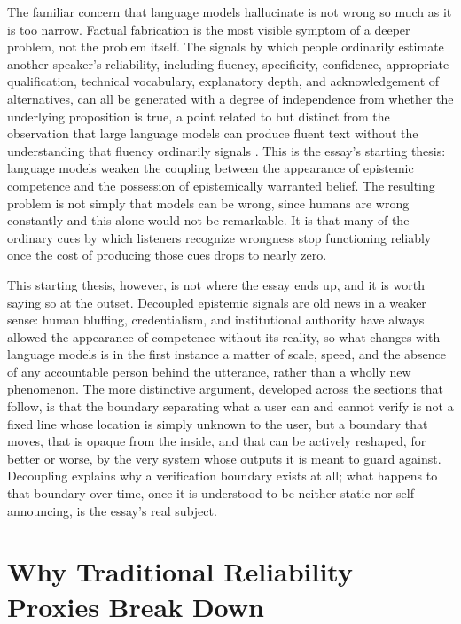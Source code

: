 \documentclass[11pt]{article}
\begin{document}
The familiar concern that language models hallucinate is not wrong so much as it is too narrow. Factual fabrication is the most visible symptom of a deeper problem, not the problem itself. The signals by which people ordinarily estimate another speaker's reliability, including fluency, specificity, confidence, appropriate qualification, technical vocabulary, explanatory depth, and acknowledgement of alternatives, can all be generated with a degree of independence from whether the underlying proposition is true, a point related to but distinct from the observation that large language models can produce fluent text without the understanding that fluency ordinarily signals \cite{bender2021}. This is the essay's starting thesis: language models weaken the coupling between the appearance of epistemic competence and the possession of epistemically warranted belief. The resulting problem is not simply that models can be wrong, since humans are wrong constantly and this alone would not be remarkable. It is that many of the ordinary cues by which listeners recognize wrongness stop functioning reliably once the cost of producing those cues drops to nearly zero.

This starting thesis, however, is not where the essay ends up, and it is worth saying so at the outset. Decoupled epistemic signals are old news in a weaker sense: human bluffing, credentialism, and institutional authority have always allowed the appearance of competence without its reality, so what changes with language models is in the first instance a matter of scale, speed, and the absence of any accountable person behind the utterance, rather than a wholly new phenomenon. The more distinctive argument, developed across the sections that follow, is that the boundary separating what a user can and cannot verify is not a fixed line whose location is simply unknown to the user, but a boundary that moves, that is opaque from the inside, and that can be actively reshaped, for better or worse, by the very system whose outputs it is meant to guard against. Decoupling explains why a verification boundary exists at all; what happens to that boundary over time, once it is understood to be neither static nor self-announcing, is the essay's real subject.

\section{Why Traditional Reliability Proxies Break Down}
\end{document}
